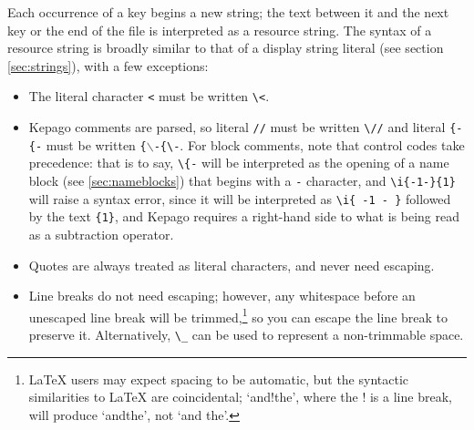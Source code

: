     Each occurrence of a key begins a new string; the text between it and the
    next key or the end of the file is interpreted as a resource string.  The
    syntax of a resource string is broadly similar to that of a display string
    literal (see section \ref{sec:strings}), with a few exceptions:
    \begin{itemize}
    \item
      The literal character \lstinline|<| must be written \lstinline|\<|.
    \item
      Kepago comments are parsed, so literal \lstinline|//| must be written
      \lstinline|\//| and literal \ifhevea\texttt{\{-}\else\lstinline|{-|\fi{}
      must be written \ifhevea\texttt{\{$\backslash$-}\else\lstinline|{\-|\fi{}.
      For block comments, note that control codes take precedence: that is to
      say, \lstinline|\{-| will be interpreted as the opening of a name block
      (see \ref{sec:nameblocks}) that begins with a \lstinline|-| character, and
      \lstinline|\i{-1-}{1}| will raise a syntax error, since it will be interpreted
      as \lstinline|\i{ -1 - }| followed by the text \lstinline|{1}|, and Kepago
      requires a right-hand side to what is being read as a subtraction operator.
    \item
      Quotes are always treated as literal characters, and never need
      escaping.
    \item
      Line breaks do not need escaping; however, any whitespace before an
      unescaped line break will be trimmed,\footnote{\LaTeX{} users may expect
      spacing to be automatic, but the syntactic similarities to \LaTeX{} are
      coincidental; `and!the', where the ! is a line break, will produce
      `andthe', not `and the'.} so you can escape the line break to preserve
      it.  Alternatively, \lstinline|\_| can be used to represent a
      non-trimmable space.
    \end{itemize}


